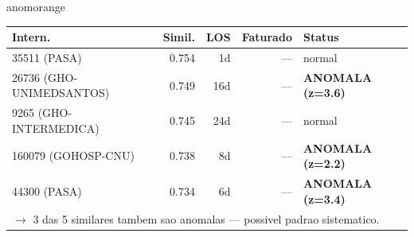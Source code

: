 \documentclass[a4paper,10pt]{article}
\begin{document}
\begin{anomalycard}[Internacao 165278 | GHO-PETROBRAS | ALTO (z=3.02)]{anomorange}
\begin{tabular}{l r r r l}\toprule\textbf{Intern.} & \textbf{Simil.} & \textbf{LOS} & \textbf{Faturado} & \textbf{Status} \\\midrule
35511 (PASA) & 0.754 & 1d & --- & \textcolor{jcubeblue}{normal} \\
26736 (GHO-UNIMEDSANTOS) & 0.749 & 16d & --- & \textcolor{anomred}{\textbf{ANOMALA (z=3.6)}} \\
9265 (GHO-INTERMEDICA) & 0.745 & 24d & --- & \textcolor{jcubeblue}{normal} \\
160079 (GOHOSP-CNU) & 0.738 & 8d & --- & \textcolor{anomred}{\textbf{ANOMALA (z=2.2)}} \\
44300 (PASA) & 0.734 & 6d & --- & \textcolor{anomred}{\textbf{ANOMALA (z=3.4)}} \\
\multicolumn{5}{l}{\textcolor{anomred}{\small $\rightarrow$ 3 das 5 similares tambem sao anomalas --- possivel padrao sistematico.}} \\
\bottomrule\end{tabular}


\end{anomalycard}

\newpage
\end{document}
